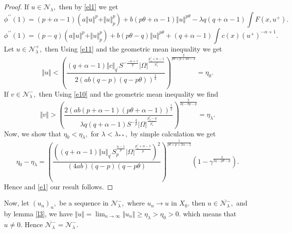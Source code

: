 \documentclass[10pt,twoside,reqno,centertags,draft]{amsart}
\begin{document}
\begin{proof}
If $ u \in \mathcal{N}_{\lambda},$ then by \ref{el1} we get
\begin{equation} \label{e10}
\phi^{\prime \prime}(1) = (p +\alpha -1) \left(a\Vert u \Vert^p + \Vert u \Vert_{p}^{p}\right) + b(p \theta +\alpha -1)\Vert u \Vert^{p \theta} - \lambda q (q +\alpha -1) \int F(x,u^+) .
\end{equation}
\begin{equation} \label{e11}
\phi^{\prime \prime}(1) = (p-q) \left(a\Vert u \Vert^p + \Vert u \Vert_{p}^{p}\right) + b(p \theta - q) \Vert u \Vert^{p \theta} + (q +\alpha -1)\int c(x)( u^+)^{-\alpha+1}.
\end{equation}
Let $ u \in \mathcal{N}_{\lambda}^{+},$ then Using \ref{e11} and the geometric mean inequality we get
\begin{equation*}
\Vert u \Vert < \left( \frac{(q +\alpha -1) \Vert c\Vert_{q^{\prime}} S^{-\frac{-\alpha +1}{p}} \vert \Omega\vert^{\frac{p^*_s  +\alpha -1}{p^*_s}}}{2
\left(ab(q-p)(q-p\theta) \right)^{\frac{1}{2}}} \right)^{\frac{2}{p\theta +p +2\alpha -2}} = \eta_0.
\end{equation*}
If $ v \in \mathcal{N}_{\lambda}^{-},$ then Using \ref{e10} and the geometric mean inequality we find
\begin{equation*}
\Vert v \Vert > \left( \frac{2 \left(ab(p +\alpha -1)(p\theta +\alpha -1)\right)^{\frac{1}{2}}}{\lambda q(q+ \alpha -1) S^{-\frac{q}{p}} \vert \Omega\vert^{\frac{p_s^*-q}{p_s^*}} } \right)^{\frac{2}{2q -\theta p -p}} = \eta_{\lambda}.
\end{equation*}
Now, we show that $ \eta_{0} < \eta_{\lambda},$ for $ \lambda < \lambda_{**},$ by simple calculation we get 
\begin{equation}
\eta_0 - \eta_{\lambda} =\left(\frac{\left( (q +\alpha -1) \Vert u\Vert_{q^{\prime}} S_{p}^{\frac{\alpha -1}{p}} \vert \Omega\vert^{\frac{p^*_s +\alpha -1}{p}} \right)^{2}}{(4 ab) (q-p)(q-p\theta)} \right)^{\frac{1}{p\theta +p +2\alpha -2}}\left( 1 -\gamma^{\frac{2}{2q -p\theta -p}} \right).
\end{equation} 
Hence and \ref{e1} our result follows.
\end{proof}
\begin{corollary}\label{cl3}
Now, let $ (u_n)_n,$ be a sequence in $ \mathcal{N}_{\lambda}^{-},$ where $ u_n \longrightarrow u$ in $ X_0.$ then $ u \in \overline{\mathcal{N}_{\lambda}^{-}},$ 
and by lemma \ref{l3}, we have $ \Vert u\Vert = \lim_{n \to \infty} \Vert u_n\Vert \geq \eta_{\lambda} > \eta_{0} >0.$ which means that $ u \neq 0.$ Hence 
$ \overline{\mathcal{N}_{\lambda}^{-}} = \mathcal{N}_{\lambda}^{-}.$
\end{corollary}
\end{document}
